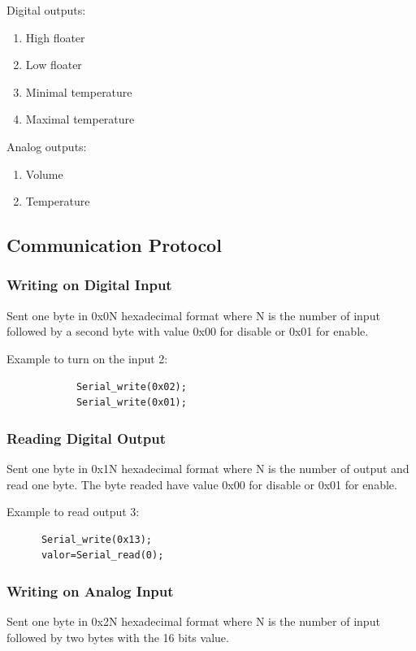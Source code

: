 Digital outputs:
\begin{enumerate}
\item High floater 
\item Low floater
\item Minimal temperature 
\item Maximal temperature
\end{enumerate}

Analog outputs:
\begin{enumerate}
\item Volume
\item Temperature
\end{enumerate}


\subsection{Communication Protocol}

\subsubsection{Writing on Digital Input}
Sent one byte in 0x0N hexadecimal format where N  is the number of input followed by a second byte with value 0x00 for disable or 0x01 for enable.  

Example to turn on the input 2:
\begin{verbatim}
            Serial_write(0x02);
            Serial_write(0x01);
\end{verbatim}


\subsubsection{Reading Digital Output}
Sent one byte in 0x1N hexadecimal format where N  is the number of output and read one byte. The byte readed have value 0x00 for disable or 0x01 for enable. 

Example to read output 3:
\begin{verbatim}
      Serial_write(0x13);
      valor=Serial_read(0);
\end{verbatim}


\subsubsection{Writing on Analog Input} 
Sent one byte in 0x2N hexadecimal format where N  is the number of input followed by two bytes with the 16 bits value.

